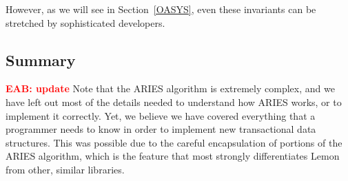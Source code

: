 \documentclass[letterpaper,twocolumn,english]{article}
\newcommand{\yad}{Lemon\xspace}
\newcommand{\eab}[1]{\textcolor{red}{\bf EAB: #1}}
\begin{document}

However, as we will see in Section~\ref{OASYS}, even these invariants
can be stretched by sophisticated developers.

\subsection{Summary}

\eab{update}
Note that the ARIES algorithm is extremely complex, and we have left
out most of the details needed to understand how ARIES works, or to
implement it correctly.  Yet, we believe we have covered everything
that a programmer needs to know in order to implement new
transactional data structures.  This was possible due to the careful
encapsulation of portions of the ARIES algorithm, which is the feature
that most strongly differentiates \yad from other, similar libraries.









\end{document}
